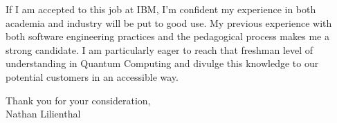 If I am accepted to this job at IBM, I'm confident my experience in both
academia and industry will be put to good use. My previous experience with both
software engineering practices and the pedagogical process makes me a strong
candidate. I am particularly eager to reach that freshman level of
understanding in Quantum Computing and divulge this knowledge to our potential
customers in an accessible way.

\vspace{1.5em}
\noindent Thank you for your consideration,\\
\noindent Nathan Lilienthal


